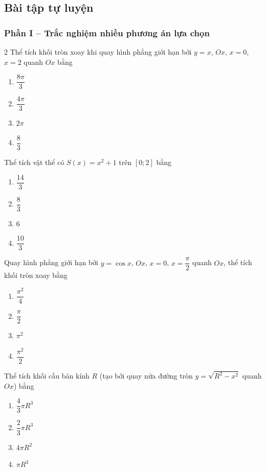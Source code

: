 \newpage
\subsection{Bài tập tự luyện}

\subsubsection*{Phần I -- Trắc nghiệm nhiều phương án lựa chọn}

\begin{multicols}{2}
\cauhoi Thể tích khối tròn xoay khi quay hình phẳng giới hạn bởi $y=x$, $Ox$, $x=0$, $x=2$ quanh $Ox$ bằng
\begin{enumerate}[label=\textbf{\Alph*.}, leftmargin=0.9cm]
  \item $\dfrac{8\pi}{3}$
  \item $\dfrac{4\pi}{3}$
  \item $2\pi$
  \item $\dfrac{8}{3}$
\end{enumerate}

\cauhoi Thể tích vật thể có $S(x)=x^2+1$ trên $[0;2]$ bằng
\begin{enumerate}[label=\textbf{\Alph*.}, leftmargin=0.9cm]
  \item $\dfrac{14}{3}$
  \item $\dfrac{8}{3}$
  \item $6$
  \item $\dfrac{10}{3}$
\end{enumerate}

\cauhoi Quay hình phẳng giới hạn bởi $y=\cos x$, $Ox$, $x=0$, $x=\dfrac{\pi}{2}$ quanh $Ox$, thể tích khối tròn xoay bằng
\begin{enumerate}[label=\textbf{\Alph*.}, leftmargin=0.9cm]
  \item $\dfrac{\pi^2}{4}$
  \item $\dfrac{\pi}{2}$
  \item $\pi^2$
  \item $\dfrac{\pi^2}{2}$
\end{enumerate}

\cauhoi Thể tích khối cầu bán kính $R$ (tạo bởi quay nửa đường tròn $y=\sqrt{R^2-x^2}$ quanh $Ox$) bằng
\begin{enumerate}[label=\textbf{\Alph*.}, leftmargin=0.9cm]
  \item $\dfrac{4}{3}\pi R^3$
  \item $\dfrac{2}{3}\pi R^3$
  \item $4\pi R^2$
  \item $\pi R^3$
\end{enumerate}


\end{multicols}
